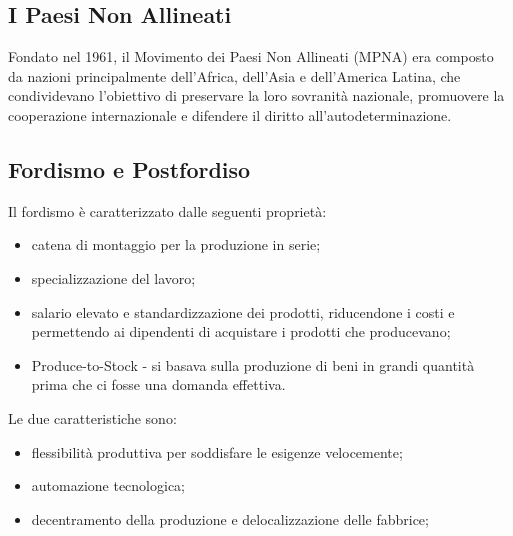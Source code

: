 \documentclass[a4paper]{article}
\begin{document}
\subsection{I Paesi Non Allineati}


Fondato nel 1961, il Movimento dei Paesi Non Allineati (MPNA) era composto da nazioni principalmente dell'Africa, dell'Asia e dell'America Latina, che condividevano l'obiettivo di preservare la loro sovranità nazionale, promuovere la cooperazione internazionale e difendere il diritto all'autodeterminazione.

\subsection{Fordismo e Postfordiso}


Il fordismo è caratterizzato dalle seguenti proprietà:
\begin{itemize}
    \item catena di montaggio per la produzione in serie;
    \item specializzazione del lavoro;
    \item salario elevato e standardizzazione dei prodotti, riducendone i costi e permettendo ai dipendenti di acquistare i prodotti che producevano;
    \item Produce-to-Stock - si basava sulla produzione di beni in grandi quantità prima che ci fosse una domanda effettiva.
\end{itemize}


Le due caratteristiche sono:
\begin{itemize}
    \item flessibilità produttiva per soddisfare le esigenze velocemente;
    \item automazione tecnologica;
    \item decentramento della produzione e delocalizzazione delle fabbrice;
\end{itemize}
\end{document}

